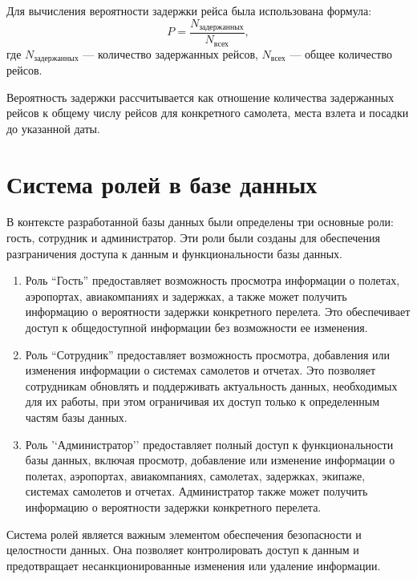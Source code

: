 Для вычисления вероятности задержки рейса была использована формула:
\begin{equation}
    P = \frac{N_{\text{задержанных}}}{N_{\text{всех}}}, \label{eq:prob}
\end{equation}
где $N_{\text{задержанных}}$ --- количество задержанных рейсов, $N_{\text{всех}}$ --- общее количество рейсов.

Вероятность задержки рассчитывается как отношение количества задержанных рейсов к общему числу рейсов для конкретного самолета, места взлета и посадки до указанной даты.

\section{Система ролей в базе данных}

В контексте разработанной базы данных были определены три основные роли: гость, сотрудник и администратор.
Эти роли были созданы для обеспечения разграничения доступа к данным и функциональности базы данных.

\begin{enumerate}[label=---]
    \item Роль ``Гость'' предоставляет возможность просмотра информации о полетах, аэропортах, авиакомпаниях и задержках, а также может получить информацию о вероятности задержки конкретного перелета.
    Это обеспечивает доступ к общедоступной информации без возможности ее изменения.
    \item Роль ``Сотрудник'' предоставляет возможность просмотра, добавления или изменения информации о системах самолетов и отчетах.
    Это позволяет сотрудникам обновлять и поддерживать актуальность данных, необходимых для их работы, при этом ограничивая их доступ только к определенным частям базы данных.
    \item Роль '`Администратор'' предоставляет полный доступ к функциональности базы данных, включая просмотр, добавление или изменение информации о полетах, аэропортах, авиакомпаниях, самолетах, задержках, экипаже, системах самолетов и отчетах.
    Администратор также может получить информацию о вероятности задержки конкретного перелета.
\end{enumerate}

Система ролей является важным элементом обеспечения безопасности и целостности данных.
Она позволяет контролировать доступ к данным и предотвращает несанкционированные изменения или удаление информации.

